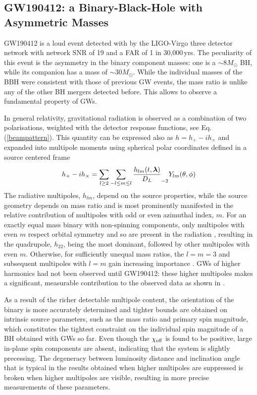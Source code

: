 \documentclass[binding=0.6cm, LaM]{sapthesis}
\begin{document}
\subsection{GW190412: a Binary-Black-Hole with Asymmetric Masses}
\label{subsec:GW1901412}
	GW190412 is a loud event detected with by the LIGO-Virgo three detector network 
	with network SNR of 19 and a FAR of 1 in 30,000\,yrs.
	The peculiarity of this event is the asymmetry in the binary component masses:
	one is a $\sim 8M_\odot$ BH, while its companion has a mass of $\sim 30M_\odot$.
	While the individual masses of the BBH were consistent with those of previous GW events,
	the mass ratio is unlike any of the other BH mergers detected before. 
	This allows to observe a fundamental property of GWs.

	In general relativity, gravitational radiation
	is observed as a combination of two polarisations, weighted with the detector response functions, see Eq.\,(\ref{beampattern}). 
	This quantity can be expressed also as $h = h_{+}-ih_{\times}$ and expanded into multipole moments 
	using spherical polar coordinates defined in a source centered frame \cite{133}
        \begin{equation}
          h_{+}-ih_{\times} = \sum_{l \geq 2} \sum_{-l \leq m \leq l} {{h_{lm}(t, \boldsymbol{\lambda})} \over {D_L}} _{-2} Y_{lm}(\theta, \phi)
        \end{equation}
	The radiative multipoles, $h_{lm}$, depend on the source properties, while the source geometry 
	depends on mass ratio and is most prominently manifested in the relative contribution 
	of multipoles with odd or even azimuthal index, $m$.
	For an exactly equal mass binary with non-spinning components, only multipoles with even $m$ 
	respect orbital symmetry and so are present in the radiation \cite{158}, resulting in the quadrupole, $h_{22}$, 
	being the most dominant, followed by other multipoles with even $m$. 
	Otherwise, for sufficiently unequal mass ratios, the $l = m = 3$ and subsequent 
	multipoles with $l = m$ gain increasing importance \cite{158, 159, 160}.
	GWs of higher harmonics had not been observed until GW190412:
	these higher multipoles makes a significant, measurable contribution to the observed data as shown in \cite{133}.

	As a result of the richer detectable multipole content, 
	the orientation of the binary is more accurately determined and 
	tighter bounds are obtained on intrinsic source parameters, 
	such as the mass ratio and primary spin magnitude, 
	which constitutes the tightest constraint on the individual spin magnitude of a BH obtained with GWs so far. 
	Even though the $\chi_{\rm eff}$ is found to be positive, 
	large in-plane spin components are absent, 
	indicating that the system is slightly precessing.
	The degeneracy between luminosity distance and inclination angle that is typical 
	in the results obtained when higher multipoles are suppressed is broken when higher multipoles are visible, 
	resulting in more precise measurements of these parameters.
\end{document}
